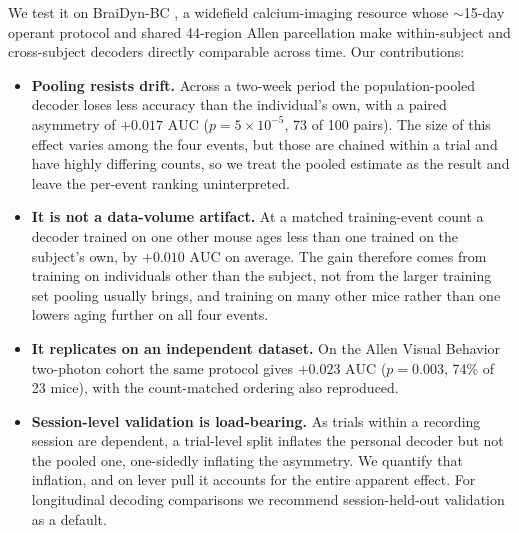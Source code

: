 \documentclass[mlabstract,onecolumn]{jmlr}
\newcommand{\auc}{\mathrm{AUC}}
\begin{document}
We test it on BraiDyn-BC \citep{kondo2025}, a widefield calcium-imaging resource whose $\sim$15-day
operant protocol and shared 44-region Allen parcellation make within-subject and cross-subject
decoders directly comparable across time. Our contributions:
\begin{itemize}\itemsep2pt
\item \textbf{Pooling resists drift.} Across a two-week period the population-pooled decoder loses
less accuracy than the individual's own, with a paired asymmetry of $+0.017$ $\auc$
($p = 5 \times 10^{-5}$, 73 of 100 pairs). The size of this effect varies
among the four events, but those are chained within a trial and have highly differing counts, so we
treat the pooled estimate as the result and leave the per-event ranking uninterpreted.
\item \textbf{It is not a data-volume artifact.} At a matched training-event count a decoder trained
on one other mouse ages less than one trained on the subject's own, by $+0.010$ $\auc$ on average.
The gain therefore comes from training on individuals other than the subject, not from the larger
training set pooling usually brings, and training on many other mice rather than one lowers aging
further on all four events.
\item \textbf{It replicates on an independent dataset.} On the Allen Visual Behavior two-photon
cohort the same protocol gives $+0.023$ $\auc$ ($p = 0.003$, 74\% of 23 mice), with the
count-matched ordering also reproduced.
\item \textbf{Session-level validation is load-bearing.} As trials within a recording session are
dependent, a trial-level split inflates the personal decoder but not the pooled one, one-sidedly
inflating the asymmetry. We quantify that inflation, and on lever pull it accounts for the entire
apparent effect. For longitudinal decoding comparisons we recommend session-held-out
validation as a default.
\end{itemize}
\end{document}
